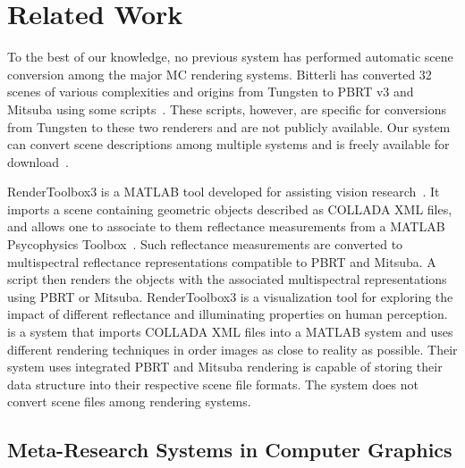 \chapter{Related Work}
\label{(sec:related_work)}

To the best of our knowledge, no previous system has performed automatic scene 
conversion among the major MC rendering systems. 
Bitterli has converted 32 scenes of various complexities and origins from 
Tungsten to PBRT v3 and Mitsuba using some scripts~\cite{tungsten}. These 
scripts, however, are specific for conversions from Tungsten to these two 
renderers and are not publicly available. 
Our system can convert scene descriptions among multiple systems and is freely 
available for download~\cite{sceneConverter}.

RenderToolbox3 is a MATLAB tool developed for assisting vision 
research~\cite{rendertoolbox}. It imports a scene containing geometric objects 
described as COLLADA XML files, and allows one to associate to them reflectance 
measurements from a MATLAB Psycophysics Toolbox~\cite{Brainard1997}. Such 
reflectance measurements are converted to multispectral reflectance 
representations compatible to PBRT and Mitsuba. A script then renders the 
objects with the associated multispectral representations using PBRT or Mitsuba. 
RenderToolbox3 is a visualization tool for exploring the impact of different 
reflectance and illuminating properties on human perception.       
\cite{rendertoolbox} is a system that imports COLLADA XML files into a MATLAB 
system and uses different rendering techniques in order images as close to 
reality as possible. Their system uses integrated PBRT and Mitsuba rendering is 
capable of storing their data structure into their respective scene file 
formats. 
The system does not 
convert scene files among rendering systems. 

\section{Meta-Research Systems in Computer Graphics}


